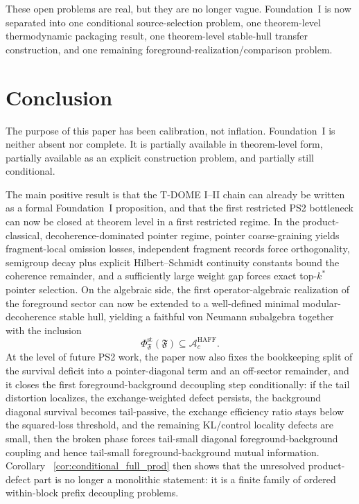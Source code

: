 \documentclass[12pt]{article}
\theoremstyle{definition}
\theoremstyle{remark}
\begin{document}
These open problems are real, but they are no longer vague. Foundation~I
is now separated into one conditional source-selection problem,
one theorem-level thermodynamic packaging result, one theorem-level
stable-hull transfer construction, and one remaining
foreground-realization/comparison problem.

\section{Conclusion}

The purpose of this paper has been calibration, not inflation.
Foundation~I is neither absent nor complete. It is partially available
in theorem-level form, partially available as an explicit construction
problem, and partially still conditional.

The main positive result is that the T-DOME I--II chain can already be
written as a formal Foundation~I proposition, and that the first
restricted PS2 bottleneck can now be closed at theorem level in a first
restricted regime. In the product-classical, decoherence-dominated
pointer regime, pointer coarse-graining yields fragment-local omission
losses, independent fragment records force orthogonality, semigroup
decay plus explicit Hilbert--Schmidt continuity constants bound the
coherence remainder, and a sufficiently large weight gap forces exact
top-\(k^*\) pointer selection. On the algebraic side, the first
operator-algebraic realization of the foreground sector can now be
extended to a well-defined minimal modular-decoherence stable hull,
yielding a faithful von Neumann subalgebra together with the inclusion
\[
\Phi_{\mathfrak F}^{\mathrm{st}}(\mathfrak F)\subseteq
\mathcal A_c^{\mathrm{HAFF}}.
\]
At the level of future PS2 work, the paper now also fixes the
bookkeeping split of the survival deficit into a pointer-diagonal term
and an off-sector remainder, and it closes the first
foreground-background decoupling step conditionally: if the tail
distortion localizes, the exchange-weighted defect persists, the
background diagonal survival becomes tail-passive, the exchange
efficiency ratio stays below the squared-loss threshold, and the
remaining KL/control locality defects are small, then the broken phase
forces tail-small diagonal foreground-background coupling and hence
tail-small foreground-background mutual information. Corollary~
\ref{cor:conditional_full_prod} then shows that the unresolved
product-defect part is no longer a monolithic statement: it is a finite
family of ordered within-block prefix decoupling problems.
\end{document}
